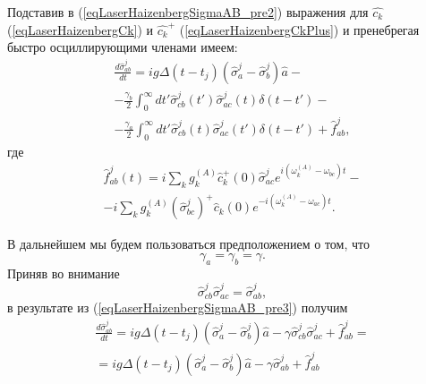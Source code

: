 Подставив в (\ref{eqLaserHaizenbergSigmaAB_pre2}) выражения для
$\hat{c_k}$ (\ref{eqLaserHaizenbergCk}) и $\hat{c_k}^{+}$
(\ref{eqLaserHaizenbergCkPlus}) и пренебрегая быстро осциллирующими
членами имеем:
\begin{eqnarray}
\frac{d \hat{\sigma}_{ab}^j}{d t} = 
i g 
\Delta\left(t - t_j\right) 
\left(\hat{\sigma}^{j}_{a} -
\hat{\sigma}^{j}_{b}\right)\hat{a} -
\nonumber \\
- \frac{\gamma_{b}}{2}
\int_0^{\infty}dt'
\hat{\sigma}^{j}_{cb}\left(t'\right)  
\hat{\sigma}^{j}_{ac}\left(t\right) 
\delta\left(t - t'\right) -
\nonumber \\ 
- \frac{\gamma_{a}}{2}
\int_0^{\infty}dt'
\hat{\sigma}^{j}_{cb}\left(t\right)  
\hat{\sigma}^{j}_{ac}\left(t'\right) 
\delta\left(t - t'\right) + \hat{f}_{ab}^{j},
\label{eqLaserHaizenbergSigmaAB_pre3}
\end{eqnarray}
где
\begin{eqnarray}
\hat{f}_{ab}^{j}\left(t\right) = 
i
\sum_{k}
g_k^{(A)}
\hat{c}_k^{+}\left(0\right)
\hat{\sigma}^{j}_{ac}  
e^{i\left(\omega_k^{(A)} - \omega_{bc}\right)t} -
\nonumber \\
-
 i
\sum_{k}
g_k^{(A)}
\left(\hat{\sigma}^{j}_{bc}\right)^{+}\hat{c}_k\left(0\right)
e^{-i\left(\omega_k^{(A)} - \omega_{ac}\right)t}.
\label{eqLaserHaizenbergFABJ}
\end{eqnarray}

В дальнейшем мы будем пользоваться предположением о том, что
\begin{equation}
\gamma_{a} =
\gamma_{b} = \gamma.
\label{eqLaserHaizenbergGamma}
\end{equation}
Приняв во внимание
\[
\hat{\sigma}^{j}_{cb}\hat{\sigma}^{j}_{ac} = 
\hat{\sigma}^{j}_{ab},
\]
в результате из (\ref{eqLaserHaizenbergSigmaAB_pre3}) получим 
\begin{eqnarray}
\frac{d \hat{\sigma}_{ab}^j}{d t} = 
i g 
\Delta\left(t - t_j\right) 
\left(\hat{\sigma}^{j}_{a} -
\hat{\sigma}^{j}_{b}\right)\hat{a} 
- \gamma \hat{\sigma}^{j}_{cb}\hat{\sigma}^{j}_{ac} 
 + \hat{f}_{ab}^{j} = 
\nonumber \\
= 
i g 
\Delta\left(t - t_j\right) 
\left(\hat{\sigma}^{j}_{a} -
\hat{\sigma}^{j}_{b}\right)\hat{a} 
- \gamma \hat{\sigma}^{j}_{ab} 
 + \hat{f}_{ab}^{j}
\label{eqLaserHaizenbergSigmaABJ}
\end{eqnarray}

